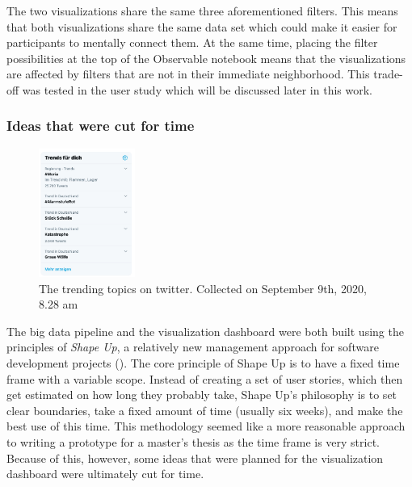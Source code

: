 The two visualizations share the same three aforementioned filters. This means that both visualizations share the same data set which could make it easier for participants to mentally connect them. At the same time, placing the filter possibilities at the top of the Observable notebook means that the visualizations are affected by filters that are not in their immediate neighborhood. This trade-off was tested in the user study which will be discussed later in this work.

\subsubsection{Ideas that were cut for time}\label{sec:cutForTime}

\begin{figure}
    \includegraphics[width=0.28\textwidth]{images/twitter_trends.jpg}
    \caption{The trending topics on twitter. Collected on September 9th, 2020, 8.28 am}
    \label{fig:twitter_trends}
\end{figure}
The big data pipeline and the visualization dashboard were both built using the principles of \emph{Shape Up}, a relatively new management approach for software development projects (\cite{singer2019}). The core principle of Shape Up is to have a fixed time frame with a variable scope. Instead of creating a set of user stories, which then get estimated on how long they probably take, Shape Up's philosophy is to set clear boundaries, take a fixed amount of time (usually six weeks), and make the best use of this time. This methodology seemed like a more reasonable approach to writing a prototype for a master's thesis as the time frame is very strict.
Because of this, however, some ideas that were planned for the visualization dashboard were ultimately cut for time.

